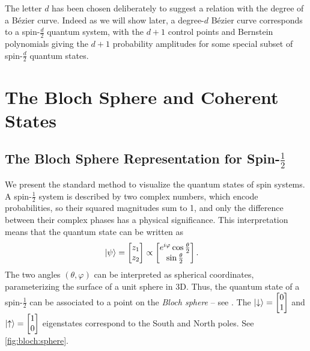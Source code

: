 \documentclass[final,3p,mathptmx]{elsarticle}
\begin{document}
The letter $d$ has been chosen deliberately to suggest a relation with the degree of a B\'{e}zier curve. Indeed as we will show later, a degree-$d$ B\'{e}zier curve corresponds to a spin-$\frac{d}{2}$ quantum system, with the $d+1$ control points and Bernstein polynomials giving the $d+1$ probability amplitudes for some special subset of spin-$\frac{d}{2}$ quantum states.

\section{The Bloch Sphere and Coherent States}\label{sec:spinfacts}
\subsection{The Bloch Sphere Representation for Spin-$\frac{1}{2}$}\label{sec:spinfacts:bloch}
We present the standard method to visualize the quantum states of spin systems. A spin-$\frac{1}{2}$ system is described by two complex numbers, which encode probabilities, so their squared magnitudes sum to 1, and only the difference between their complex phases has a physical significance. This interpretation means that the quantum state can be written as
\begin{align}
\ket{\psi} &= 
\begin{bmatrix} z_{1} \\ z_{2} \end{bmatrix} \propto \begin{bmatrix} e^{i\varphi}\cos{\frac{\theta}{2}} \\ \sin{\frac{\theta}{2}} \end{bmatrix}.
\end{align}
The two angles $(\theta,\varphi)$ can be interpreted as spherical coordinates, parameterizing the surface of a unit sphere in 3D. Thus, the quantum state of a spin-$\frac{1}{2}$ can be associated to a point on the \emph{Bloch sphere} -- see \cite[Ch. 5.2]{bengtsson2006geometry}. The $\ket{\downarrow} = \begin{bmatrix}
0 \\ 
1
\end{bmatrix}$ 
and 
$\ket{\uparrow} = \begin{bmatrix}
1 \\ 
0
\end{bmatrix}$ eigenstates correspond to the South and North poles. See \autoref{fig:bloch:sphere}.
\end{document}
